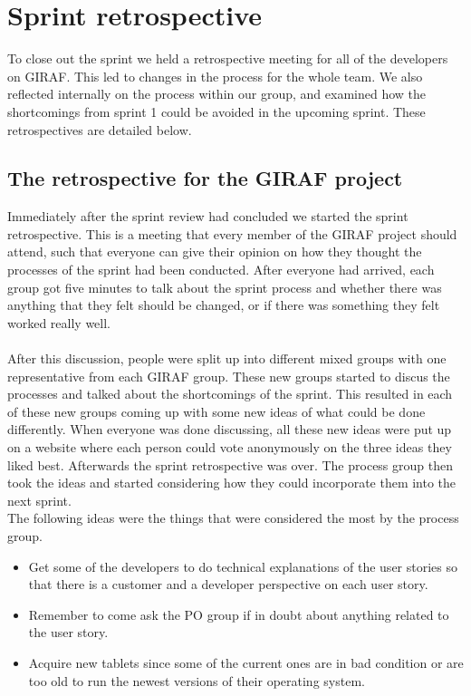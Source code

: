 \section{Sprint retrospective}
To close out the sprint we held a retrospective meeting for all of the developers on GIRAF.
This led to changes in the process for the whole team.
We also reflected internally on the process within our group, and examined how the shortcomings from sprint 1 could be avoided in the upcoming sprint.
These retrospectives are detailed below.

\subsection{The retrospective for the GIRAF project}\label{retro1giraf}
Immediately after the sprint review had concluded we started the sprint retrospective.
This is a meeting that every member of the GIRAF project should attend, such that everyone can give their opinion on how they thought the processes of the sprint had been conducted.
After everyone had arrived, each group got five minutes to talk about the sprint process and whether there was anything that they felt should be changed, or if there was something they felt worked really well.
\\\\
After this discussion, people were split up into different mixed groups with one representative from each GIRAF group.
These new groups started to discus the processes and talked about the shortcomings of the sprint.
This resulted in each of these new groups coming up with some new ideas of what could be done differently.
When everyone was done discussing, all these new ideas were put up on a website where each person could vote anonymously on the three ideas they liked best.
Afterwards the sprint retrospective was over.
The process group then took the ideas and started considering how they could incorporate them into the next sprint.
\\
\noindent
The following ideas were the things that were considered the most by the process group.
\begin{itemize}
    \item Get some of the developers to do technical explanations of the user stories so that there is a customer and a developer perspective on each user story.
    \item Remember to come ask the PO group if in doubt about anything related to the user story.
    \item Acquire new tablets since some of the current ones are in bad condition or are too old to run the newest versions of their operating system.
\end{itemize}
